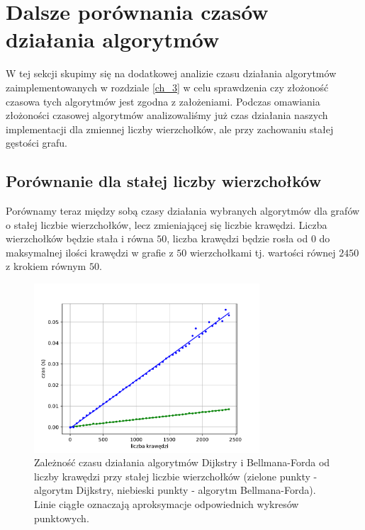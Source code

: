 \documentclass[12pt,a4paper]{book}
\theoremstyle{definition}
\numberwithin{equation}{chapter}
\begin{document}
\section{Dalsze porównania czasów działania algorytmów}

W tej sekcji skupimy się na dodatkowej analizie czasu działania algorytmów zaimplementowanych w rozdziale \ref{ch_3} w celu sprawdzenia czy złożoność czasowa tych algorytmów jest zgodna z założeniami. 
Podczas omawiania złożoności czasowej algorytmów analizowaliśmy już czas działania naszych implementacji dla zmiennej liczby wierzchołków, ale przy zachowaniu stałej gęstości grafu.

\subsection*{Porównanie dla stałej liczby wierzchołków}

Porównamy teraz między sobą czasy działania wybranych algorytmów dla grafów o stałej liczbie wierzchołków, lecz zmieniającej się liczbie krawędzi. Liczba wierzchołków będzie stała i równa $50$, liczba krawędzi będzie rosła od $0$ do maksymalnej ilości krawędzi w grafie z $50$ wierzchołkami tj. wartości równej $2450$ z krokiem równym $50$.

\begin{figure}[H]
\centering
\includegraphics[width=0.75\textwidth]{images/Wykres_stale_wierzcholki_Dijkstra_Bellman_Ford.pdf}
\caption{Zależność czasu działania algorytmów Dijkstry i Bellmana-Forda od liczby krawędzi przy stałej liczbie wierzchołków (zielone punkty - algorytm Dijkstry, niebieski punkty - algorytm Bellmana-Forda). Linie ciągłe oznaczają aproksymacje odpowiednich wykresów punktowych.}
\label{rys_wykres_wierzch_dij_b_f}
\end{figure}
\end{document}
